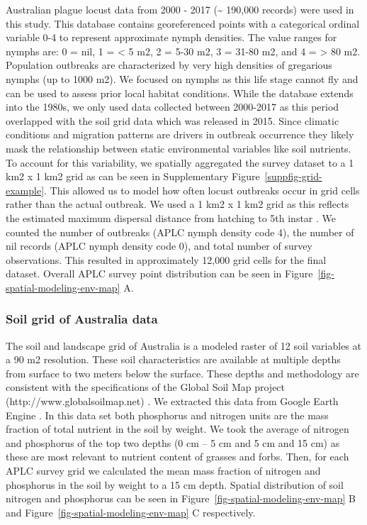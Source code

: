 \documentclass[
]{article}
\begin{document}
Australian plague locust data from 2000 - 2017 (\textasciitilde{}
190,000 records) were used in this study. This database contains
georeferenced points with a categorical ordinal variable 0-4 to
represent approximate nymph densities. The value ranges for nymphs are:
0 = nil, 1 = \textless{} 5 m2, 2 = 5-30 m2, 3 = 31-80 m2, and 4 =
\textgreater{} 80 m2. Population outbreaks are characterized by very
high densities of gregarious nymphs (up to 1000 m2). We focused on
nymphs as this life stage cannot fly and can be used to assess prior
local habitat conditions. While the database extends into the 1980s, we
only used data collected between 2000-2017 as this period overlapped
with the soil grid data which was released in 2015. Since climatic
conditions and migration patterns are drivers in outbreak occurrence
\citep{lawton_seeing_2022, veran_modeling_2015} they likely mask the
relationship between static environmental variables like soil nutrients.
To account for this variability, we spatially aggregated the survey
dataset to a 1 km2 x 1 km2 grid as can be seen in
Supplementary Figure~\ref{suppfig-grid-example}. This allowed us to
model how often locust outbreaks occur in grid cells rather than the
actual outbreak. We used a 1 km2 x 1 km2 grid as this reflects the
estimated maximum dispersal distance from hatching to 5th instar
\citep{hunter_aerial_2008}. We counted the number of outbreaks (APLC
nymph density code 4), the number of nil records (APLC nymph density
code 0), and total number of survey observations. This resulted in
approximately 12,000 grid cells for the final dataset. Overall APLC
survey point distribution can be seen in
Figure~\ref{fig-spatial-modeling-env-map} A.

\subsubsection{Soil grid of Australia
data}\label{soil-grid-of-australia-data}

The soil and landscape grid of Australia is a modeled raster of 12 soil
variables at a 90 m2 resolution. These soil characteristics are
available at multiple depths from surface to two meters below the
surface. These depths and methodology are consistent with the
specifications of the Global Soil Map project
(http://www.globalsoilmap.net) \citep{grundy_soil_2015}. We extracted
this data from Google Earth Engine \citep{gorelick_google_2017}. In this
data set both phosphorus and nitrogen units are the mass fraction of
total nutrient in the soil by weight. We took the average of nitrogen
and phosphorus of the top two depths (0 cm -- 5 cm and 5 cm and 15 cm)
as these are most relevant to nutrient content of grasses and forbs.
Then, for each APLC survey grid we calculated the mean mass fraction of
nitrogen and phosphorus in the soil by weight to a 15 cm depth. Spatial
distribution of soil nitrogen and phosphorus can be seen in
Figure~\ref{fig-spatial-modeling-env-map} B and
Figure~\ref{fig-spatial-modeling-env-map} C respectively.
\end{document}
